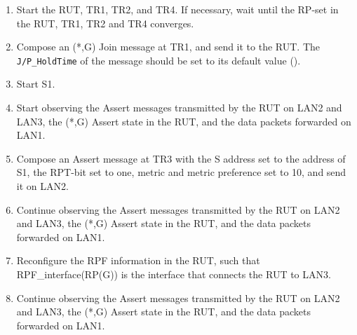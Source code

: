 \documentclass[11pt]{report}
\begin{document}
\begin{enumerate}

  \item Start the RUT, TR1, TR2, and TR4. If necessary, wait until the RP-set
  in the RUT, TR1, TR2 and TR4 converges.

  \item Compose an (*,G) Join message at TR1, and send it to the RUT.
  The \verb=J/P_HoldTime= of the message should be set to its default
  value ({\PimsmJPHoldTime}).

  \item Start S1.

  \item Start observing the Assert messages transmitted by the RUT on
  LAN2 and LAN3, the (*,G) Assert state in the RUT, and the data packets
  forwarded on LAN1.

  \item Compose an Assert message at TR3 with the S address set to the
  address of S1, the RPT-bit set to one, metric and metric preference set to
  10, and send it on LAN2.

  \item Continue observing the Assert messages transmitted by the RUT on
  LAN2 and LAN3, the (*,G) Assert state in the RUT, and the data packets
  forwarded on LAN1.

  \item Reconfigure the RPF information in the RUT, such that
  RPF\_interface(RP(G)) is the interface that connects the RUT to LAN3.

  \item Continue observing the Assert messages transmitted by the RUT on
  LAN2 and LAN3, the (*,G) Assert state in the RUT, and the data packets
  forwarded on LAN1.

\end{enumerate}

\end{document}
